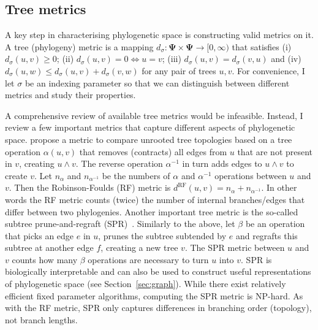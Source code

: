 \subsection{Tree metrics}
\label{sec:metrics}

A key step in characterising phylogenetic space is constructing valid metrics on it.
A tree (phylogeny) metric is a mapping $d_\sigma : \boldsymbol \Psi \times \boldsymbol \Psi \to [0, \infty)$ that satisfies (i) $d_\sigma(u, v) \geq 0$; (ii) $d_\sigma(u, v) = 0 \iff u = v$;  (iii) $d_\sigma(u, v) = d_\sigma(v, u)$ and (iv) $d_\sigma(u, w) \leq d_\sigma(u, v) + d_\sigma(v, w)$ for any pair of trees $u, v$. 
For convenience, I let $\sigma$ be an indexing parameter so that we can distinguish between different metrics and study their properties.

A comprehensive review of available tree metrics would be infeasible.
Instead, I review a few important metrics that capture different aspects of phylogenetic space.
\cite{Robinson1981} propose a metric to compare unrooted tree topologies based on a tree operation $\alpha(u, v)$ that removes (contracts) all edges from $u$ that are not present in $v$, creating $u \wedge v$.
The reverse operation $\alpha^{-1}$ in turn adds edges to $u \wedge v$ to create $v$.
Let $n_\alpha$ and $n_{\alpha^{-1}}$ be the numbers of $\alpha$ and $\alpha^{-1}$ operations between $u$ and $v$.
Then the Robinson-Foulds (RF) metric is $d^{\text{RF}}(u, v) = n_\alpha + n_{\alpha^{-1}}$.
In other words the RF metric counts (twice) the number of internal branches/edges that differ between two phylogenies.
Another important tree metric is the so-called subtree prune-and-regraft (SPR)~\citep{Allen2001}.
Similarly to the above, let $\beta$ be an operation that picks an edge $e$ in $u$, prunes the subtree subtended by $e$ and regrafts this subtree at another edge $f$, creating a new tree $v$.
The SPR metric between $u$ and $v$ counts how many $\beta$ operations are necessary to turn $u$ into $v$. 
SPR is biologically interpretable and can also be used to construct useful representations of phylogenetic space (see Section~\ref{sec:graph}).
While there exist relatively efficient fixed parameter algorithms, computing the SPR metric is NP-hard.
As with the RF metric, SPR only captures differences in branching order (topology), not branch lengths.

